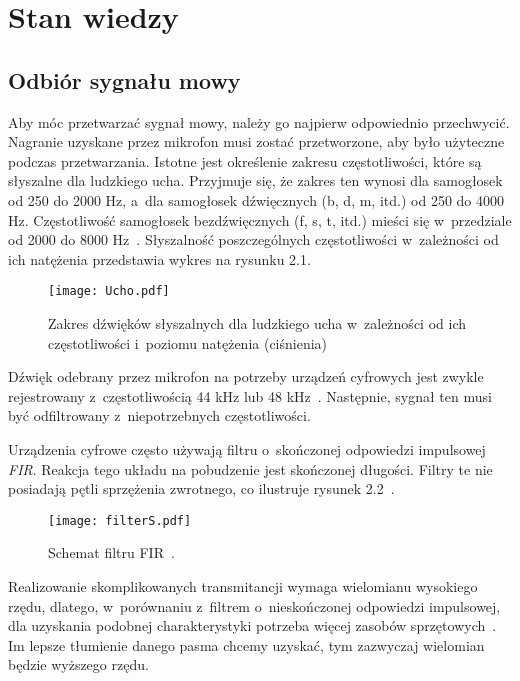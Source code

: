 \newpage
\section{Stan wiedzy}

\subsection{Odbiór sygnału mowy}

Aby móc przetwarzać sygnał mowy, należy go najpierw odpowiednio przechwycić. Nagranie uzyskane przez mikrofon musi zostać przetworzone, aby było użyteczne podczas przetwarzania. Istotne jest określenie zakresu częstotliwości, które są słyszalne dla ludzkiego ucha. Przyjmuje się, że zakres ten wynosi dla samogłosek od 250 do 2000 Hz, a~dla samogłosek dźwięcznych (b, d, m, itd.) od 250 do 4000 Hz. Częstotliwość samogłosek bezdźwięcznych (f, s, t, itd.) mieści się w~przedziale od 2000 do 8000 Hz~\cite{ecophon:speech}. Słyszalność poszczególnych częstotliwości w~zależności od ich natężenia przedstawia wykres na rysunku 2.1.

\begin{figure}[h]
	\centering
	\texttt{[image: Ucho.pdf]}
	\caption{Zakres dźwięków słyszalnych dla ludzkiego ucha w~zależności od ich częstotliwości i~poziomu natężenia (ciśnienia)~\cite{DzwiekiUcho}}
\end{figure}
\FloatBarrier %

Dźwięk odebrany przez mikrofon na potrzeby urządzeń cyfrowych jest zwykle rejestrowany z~częstotliwością 44 kHz lub 48 kHz~\cite{48}. Następnie, sygnał ten musi być odfiltrowany z~niepotrzebnych częstotliwości.

Urządzenia cyfrowe często używają filtru o~skończonej odpowiedzi impulsowej \textit{FIR}. Reakcja tego układu na pobudzenie jest skończonej długości. Filtry te nie posiadają pętli sprzężenia zwrotnego, co ilustruje rysunek 2.2~\cite{Wiki:FIR}.

\begin{figure}[h]
	\centering
	\texttt{[image: filterS.pdf]}
	\caption{Schemat filtru FIR~\cite{Wiki:FIR}.}
\end{figure}
\FloatBarrier %

Realizowanie skomplikowanych transmitancji wymaga wielomianu wysokiego rzędu, dlatego, w~porównaniu z~filtrem o~nieskończonej odpowiedzi impulsowej, dla uzyskania podobnej charakterystyki potrzeba więcej zasobów sprzętowych~\cite{Wiki:FIR}. Im lepsze tłumienie danego pasma chcemy uzyskać, tym zazwyczaj wielomian będzie wyższego rzędu.

